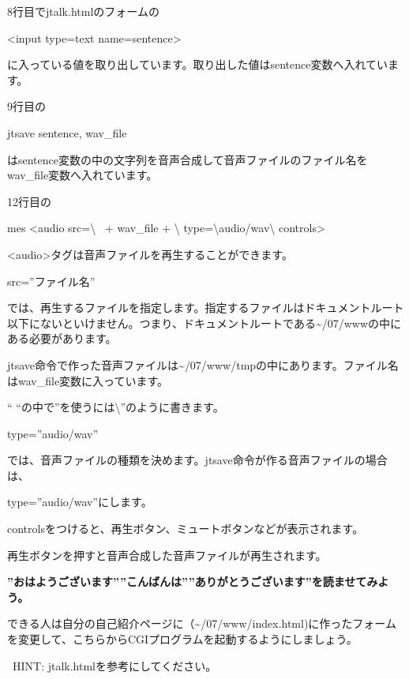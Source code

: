 \bigskip

8行目でjtalk.htmlのフォームの

{\textless}input type={\textquotedbl}text{\textquotedbl} name={\textquotedbl}sentence{\textquotedbl}{\textgreater}

に入っている値を取り出しています。取り出した値はsentence変数へ入れています。

9行目の

jtsave sentence, wav\_file

はsentence変数の中の文字列を音声合成して音声ファイルのファイル名をwav\_file変数へ入れています。

12行目の

mes {\textquotedbl}{\textless}audio src={\textbackslash}{\textquotedbl}{\textquotedbl} \ + wav\_file +
{\textquotedbl}{\textbackslash}{\textquotedbl}
type={\textbackslash}{\textquotedbl}audio/wav{\textbackslash}{\textquotedbl} controls{\textgreater}{\textquotedbl}

	{\textless}audio{\textgreater}タグは音声ファイルを再生することができます。

src=”ファイル名”

では、再生するファイルを指定します。指定するファイルはドキュメントルート以下にないといけません。つまり、ドキュメントルートである{\textasciitilde}/07/wwwの中にある必要があります。

jtsave命令で作った音声ファイルは{\textasciitilde}/07/www/tmpの中にあります。ファイル名はwav\_file変数に入っています。

“
“の中で”を使うには{\textbackslash}”のように書きます。

type=”audio/wav”

では、音声ファイルの種類を決めます。jtsave命令が作る音声ファイルの場合は、

type=”audio/wav”にします。

controlsをつけると、再生ボタン、ミュートボタンなどが表示されます。

再生ボタンを押すと音声合成した音声ファイルが再生されます。

\clearpage
{}\theQuestion\label{Q:Jtalk}

{\bfseries
	”おはようございます””こんばんは””ありがとうございます”を読ませてみよう。}


\bigskip

できる人は自分の自己紹介ページに（{\textasciitilde}/07/www/index.html)に作ったフォームを変更して、こちらからCGIプログラムを起動するようにしましょう。

\ HINT: jtalk.htmlを参考にしてください。